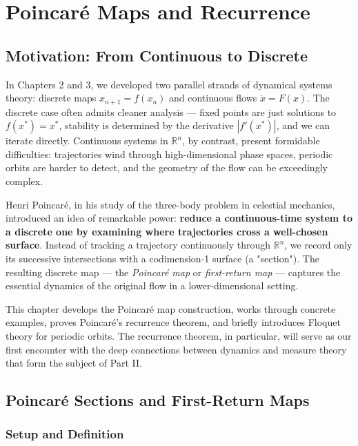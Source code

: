 \chapter{Poincaré Maps and Recurrence}\label{ch:4}

\section{Motivation: From Continuous to Discrete}\label{sec:4.1}

In Chapters 2 and 3, we developed two parallel strands of dynamical systems theory: discrete maps $x_{n+1} = f(x_n)$ and continuous flows $\dot{x} = F(x)$. The discrete case often admits cleaner analysis --- fixed points are just solutions to $f(x^*) = x^*$, stability is determined by the derivative $|f'(x^*)|$, and we can iterate directly. Continuous systems in $\mathbb{R}^n$, by contrast, present formidable difficulties: trajectories wind through high-dimensional phase spaces, periodic orbits are harder to detect, and the geometry of the flow can be exceedingly complex.

Henri Poincaré, in his study of the three-body problem in celestial mechanics, introduced an idea of remarkable power: \textbf{reduce a continuous-time system to a discrete one by examining where trajectories cross a well-chosen surface}. Instead of tracking a trajectory continuously through $\mathbb{R}^n$, we record only its successive intersections with a codimension-1 surface (a "section"). The resulting discrete map --- the \textit{Poincaré map} or \textit{first-return map} --- captures the essential dynamics of the original flow in a lower-dimensional setting.

This chapter develops the Poincaré map construction, works through concrete examples, proves Poincaré's recurrence theorem, and briefly introduces Floquet theory for periodic orbits. The recurrence theorem, in particular, will serve as our first encounter with the deep connections between dynamics and measure theory that form the subject of Part II.


\section{Poincaré Sections and First-Return Maps}\label{sec:4.2}

\subsection{Setup and Definition}\label{sec:4.2.1}

